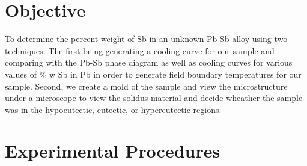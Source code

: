 \documentclass{article}
\begin{document}



\section{Objective}

To determine the percent weight of Sb in an unknown Pb-Sb alloy using two techniques. The first being generating a cooling curve for our sample and comparing with the Pb-Sb phase diagram as well as cooling curves for various values of \% w Sb in Pb in order to generate field boundary temperatures for our sample. Second, we create a mold of the sample and view the microstructure under a microscope to view the solidus material and decide wheather the sample was in the hypoeutectic, eutectic, or hypereutectic regions.



\section{Experimental Procedures}
\end{document}
